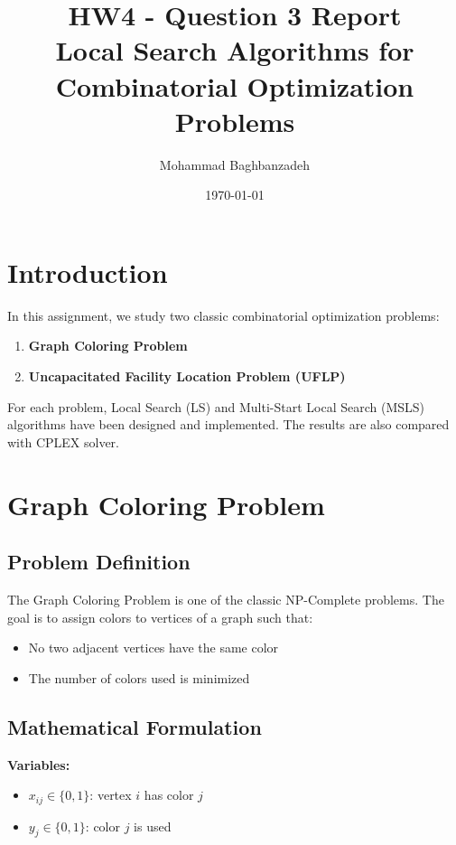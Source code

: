 \documentclass[12pt,a4paper]{article}
\title{\textbf{HW4 - Question 3 Report}\\
\large Local Search Algorithms for Combinatorial Optimization Problems}
\author{Mohammad Baghbanzadeh}
\date{\today}
\begin{document}
\maketitle
\tableofcontents
\newpage

\section{Introduction}

In this assignment, we study two classic combinatorial optimization problems:
\begin{enumerate}
    \item \textbf{Graph Coloring Problem}
    \item \textbf{Uncapacitated Facility Location Problem (UFLP)}
\end{enumerate}

For each problem, Local Search (LS) and Multi-Start Local Search (MSLS) algorithms have been designed and implemented. The results are also compared with CPLEX solver.

\section{Graph Coloring Problem}

\subsection{Problem Definition}

The Graph Coloring Problem is one of the classic NP-Complete problems. The goal is to assign colors to vertices of a graph such that:
\begin{itemize}
    \item No two adjacent vertices have the same color
    \item The number of colors used is minimized
\end{itemize}

\subsection{Mathematical Formulation}

\textbf{Variables:}
\begin{itemize}
    \item $x_{ij} \in \{0,1\}$: vertex $i$ has color $j$
    \item $y_j \in \{0,1\}$: color $j$ is used
\end{itemize}
\end{document}
